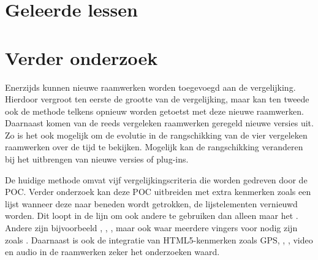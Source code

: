 \section{Geleerde lessen} %


\pagebreak
\section{Verder onderzoek} %


Enerzijds kunnen nieuwe raamwerken worden toegevoegd aan de vergelijking.
Hierdoor vergroot ten eerste de grootte van de vergelijking, maar kan ten tweede ook de methode telkens opnieuw worden getoetst met deze nieuwe raamwerken.
Daarnaast komen van de reeds vergeleken raamwerken geregeld nieuwe versies uit.
Zo is het ook mogelijk om de evolutie in de rangschikking van de vier vergeleken raamwerken over de tijd te bekijken.
Mogelijk kan de rangschikking veranderen bij het uitbrengen van nieuwe versies of plug-ins.

De huidige methode omvat vijf vergelijkingscriteria die worden gedreven door de POC.
Verder onderzoek kan deze POC uitbreiden met extra kenmerken zoals een lijst wanneer deze naar beneden wordt getrokken, de lijstelementen vernieuwd worden.
Dit loopt in de lijn om ook andere  te gebruiken dan alleen maar het  .
Andere  zijn bijvoorbeeld , , , maar ook  waar meerdere vingers voor nodig zijn zoals .
Daarnaast is ook de integratie van HTML5-kenmerken zoals GPS, , , video en audio in de raamwerken zeker het onderzoeken waard.

